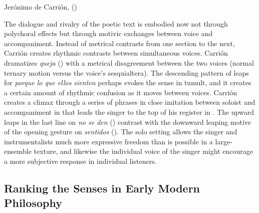 \begin{musicexample}
    \caption{Jerónimo de Carrión,  ()} %

    \label{music:Carrion-Si_los_sentidos}

\end{musicexample}

The dialogue and rivalry of the poetic text is embodied now not through
polychoral effects but through motivic exchanges between voice and
accompaniment.
Instead of metrical contrasts from one section to the next, Carrión creates
rhythmic contrasts between simultaneous voices.
Carrión dramatizes \emph{queja} () with a metrical disagreement
between the two voices (normal ternary motion versus the voice's sesquialtera).
The descending pattern of leaps for \emph{porque lo que ellos sienten} perhaps
evokes the sense in tumult, and it creates a certain amount of rhythmic
confusion as it moves between voices.
Carrión creates a climax through a series of phrases in close imitation between
soloist and accompaniment in  that leads the singer to the top
of his register in .
The upward leaps in the last line on \emph{no se den} ()
contrast with the downward leaping motive of the opening gesture on
\emph{sentidos} ().
The solo setting allows the singer and instrumentalists much more expressive
freedom than is possible in a large-ensemble texture, and likewise the
individual voice of the singer might encourage a more subjective response in
individual listeners.


\subsection{Ranking the Senses in Early Modern Philosophy}

